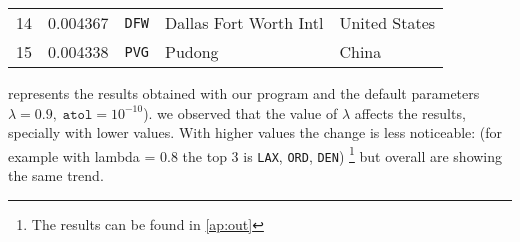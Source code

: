 \begin{table}[H]
\begin{tabular}{rrcll}
14 & 0.004367 & \texttt{DFW}  & Dallas Fort Worth Intl          & United States        \\
15 & 0.004338 & \texttt{PVG}  & Pudong                          & China                \\
\bottomrule
\end{tabular}
\end{table}

 represents the results obtained with our program and the default parameters $\lambda = 0.9,\; \texttt{atol} = 10^{-10}$). we observed that the value of $\lambda$ affects the results, specially with lower
values. With higher values the change is less noticeable:
(for example with lambda = 0.8 the top 3 is \texttt{LAX}, \texttt{ORD}, \texttt{DEN})%
\footnote{The results can be found in \cref{ap:out}}
but overall are showing the same trend.
